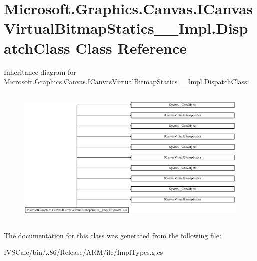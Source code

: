 \hypertarget{class_microsoft_1_1_graphics_1_1_canvas_1_1_i_canvas_virtual_bitmap_statics_____impl_1_1_dispatch_class}{}\section{Microsoft.\+Graphics.\+Canvas.\+I\+Canvas\+Virtual\+Bitmap\+Statics\+\_\+\+\_\+\+Impl.\+Dispatch\+Class Class Reference}
\label{class_microsoft_1_1_graphics_1_1_canvas_1_1_i_canvas_virtual_bitmap_statics_____impl_1_1_dispatch_class}
Inheritance diagram for Microsoft.\+Graphics.\+Canvas.\+I\+Canvas\+Virtual\+Bitmap\+Statics\+\_\+\+\_\+\+Impl.\+Dispatch\+Class\+:\begin{figure}[H]
\begin{center}
\leavevmode
\includegraphics[height=6.754386cm]{class_microsoft_1_1_graphics_1_1_canvas_1_1_i_canvas_virtual_bitmap_statics_____impl_1_1_dispatch_class}
\end{center}
\end{figure}


The documentation for this class was generated from the following file\+:\begin{DoxyCompactItemize}
\item 
I\+V\+S\+Calc/bin/x86/\+Release/\+A\+R\+M/ilc/Impl\+Types.\+g.\+cs\end{DoxyCompactItemize}
